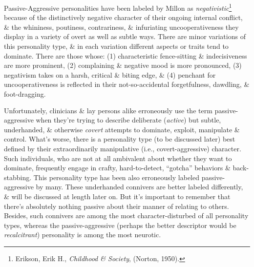\documentclass{article}
\numberwithin{equation}{section}
\begin{document}
Passive-Aggressive personalities have been labeled by Millon as \textit{negativistic}\footnote{Erikson, Erik H., \textit{Childhood \& Society}, (Norton, 1950).} because of the distinctively negative character of their ongoing internal conflict, \& the whininess, poutiness, contrariness, \& infuriating uncooperativeness they display in a variety of overt as well as subtle ways. There are minor variations of this personality type, \& in each variation different aspects or traits tend to dominate. There are those whose: (1) characteristic fence-sitting \& indecisiveness are more prominent, (2) complaining \& negative mood is more pronounced, (3) negativism takes on a harsh, critical \& biting edge, \& (4) penchant for uncooperativeness is reflected in their not-so-accidental forgetfulness, dawdling, \& foot-dragging.

Unfortunately, clinicians \& lay persons alike erroneously use the term passive-aggressive when they're trying to describe deliberate (\textit{active}) but subtle, underhanded, \& otherwise \textit{covert} attempts to dominate, exploit, manipulate \& control. What's worse, there is a personality type (to be discussed later) best defined by their extraordinarily manipulative (i.e., covert-aggressive) character. Such individuals, who are not at all ambivalent about whether they want to dominate, frequently engage in crafty, hard-to-detect, ``gotcha'' behaviors \& back-stabbing. This personality type has been also erroneously labeled passive-aggressive by many. These underhanded connivers are better labeled differently, \& will be discussed at length later on. But it's important to remember that there's absolutely nothing passive about their manner of relating to others. Besides, such connivers are among the most character-disturbed of all personality types, whereas the passive-aggressive (perhaps the better descriptor would be \textit{recalcitrant}) personality is among the most neurotic.
\end{document}
